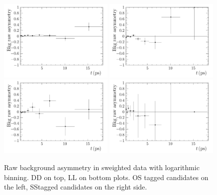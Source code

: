 \begin{figure}[!htb]
\centering
\includegraphics[width=0.49\textwidth]{06-Bd2JpsiKS/tikz/pdf/BackgroundAsymmetryByHand_DD_OS_data.pdf}
\includegraphics[width=0.49\textwidth]{06-Bd2JpsiKS/tikz/pdf/BackgroundAsymmetryByHand_DD_SSPion_data.pdf}\\
\includegraphics[width=0.49\textwidth]{06-Bd2JpsiKS/tikz/pdf/BackgroundAsymmetryByHand_LL_OS_data.pdf}
\includegraphics[width=0.49\textwidth]{06-Bd2JpsiKS/tikz/pdf/BackgroundAsymmetryByHand_LL_SSPion_data.pdf}
\caption{Raw background asymmetry in sweighted data with logarithmic binning.
DD on top, LL on bottom plots. OS tagged candidates on the left, SS\pion tagged
candidates on the right side.}
\label{fig:background_asymmetry_sweighted}
\end{figure}
